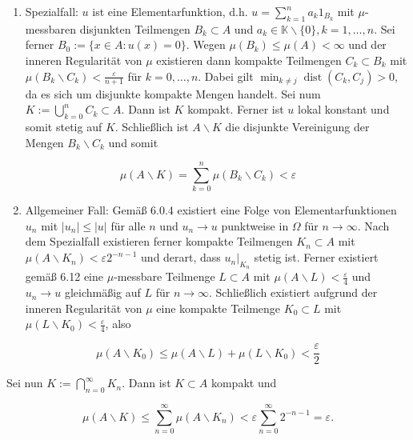 \documentclass[10pt, letterpaper]{article}
\begin{document}
\begin{enumerate}
  \item Spezialfall: $u$ ist eine Elementarfunktion, d.h. $u=\sum_{k=1}^{n} a_{k} 1_{B_{k}}$ mit $\mu$-messbaren disjunkten Teilmengen $B_{k} \subset A$ und $a_{k} \in \mathbb{K} \backslash\{0\}, k=1, \ldots, n$. Sei ferner $B_{0}:= \{x \in A: u(x)=0\}$. Wegen $\mu\left(B_{k}\right) \leq \mu(A)<\infty$ und der inneren Regularität von $\mu$ existieren dann kompakte Teilmengen $C_{k} \subset B_{k}$ mit $\mu\left(B_{k} \backslash C_{k}\right)<\frac{\varepsilon}{n+1}$ für $k=0, \ldots, n$. Dabei gilt $\min _{k \neq j} \operatorname{dist}\left(C_{k}, C_{j}\right)>0$, da es sich um disjunkte kompakte Mengen handelt. Sei num $K:=\bigcup_{k=0}^{n} C_{k} \subset A$. Dann ist $K$ kompakt. Ferner ist $u$ lokal konstant und somit stetig auf $K$. Schließlich ist $A \backslash K$ die disjunkte Vereinigung der Mengen $B_{k} \backslash C_{k}$ und somit
\end{enumerate}

$$
\mu(A \backslash K)=\sum_{k=0}^{n} \mu\left(B_{k} \backslash C_{k}\right)<\varepsilon
$$

\begin{enumerate}
  \setcounter{enumi}{1}
  \item Allgemeiner Fall: Gemäß 6.0.4 existiert eine Folge von Elementarfunktionen $u_{n}$ mit $\left|u_{n}\right| \leq|u|$ für alle $n$ und $u_{n} \rightarrow u$ punktweise in $\Omega$ für $n \rightarrow \infty$. Nach dem Spezialfall existieren ferner kompakte Teilmengen $K_{n} \subset A$ mit $\mu\left(A \backslash K_{n}\right)<\varepsilon 2^{-n-1}$ und derart, dass $\left.u_{n}\right|_{K_{n}}$ stetig ist. Ferner existiert gemäß 6.12 eine $\mu$-messbare Teilmenge $L \subset A$ mit $\mu(A \backslash L)<\frac{\varepsilon}{4}$ und $u_{n} \rightarrow u$ gleichmäßig auf $L$ für $n \rightarrow \infty$. Schließlich existiert aufgrund der inneren Regularität von $\mu$ eine kompakte Teilmenge $K_{0} \subset L$ mit $\mu\left(L \backslash K_{0}\right)<\frac{\varepsilon}{4}$, also
\end{enumerate}

$$
\mu\left(A \backslash K_{0}\right) \leq \mu(A \backslash L)+\mu\left(L \backslash K_{0}\right)<\frac{\varepsilon}{2}
$$

Sei nun $K:=\bigcap_{n=0}^{\infty} K_{n}$. Dann ist $K \subset A$ kompakt und

$$
\mu(A \backslash K) \leq \sum_{n=0}^{\infty} \mu\left(A \backslash K_{n}\right)<\varepsilon \sum_{n=0}^{\infty} 2^{-n-1}=\varepsilon .
$$
\end{document}
